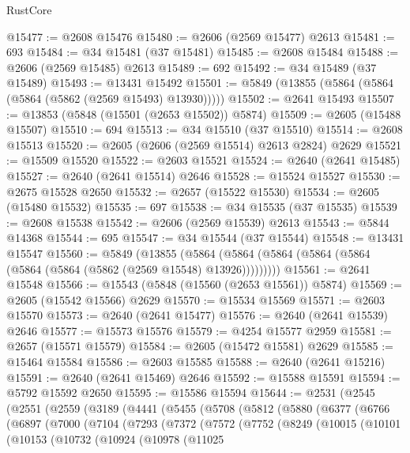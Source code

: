 \begin{lexlean}{RustCore}
\begin{coremodule}
@15477 := @2608 @15476
@15480 := @2606 (@2569 @15477) @2613
@15481 := 693
@15484 := @34 @15481 (@37 @15481)
@15485 := @2608 @15484
@15488 := @2606 (@2569 @15485) @2613
@15489 := 692
@15492 := @34 @15489 (@37 @15489)
@15493 := @13431 @15492
@15501 := @5849 (@13855 (@5864 (@5864 (@5864 (@5862 (@2569 @15493) @13930)))))
@15502 := @2641 @15493
@15507 := @13853 (@5848 (@15501 (@2653 @15502)) @5874)
@15509 := @2605 (@15488 @15507)
@15510 := 694
@15513 := @34 @15510 (@37 @15510)
@15514 := @2608 @15513
@15520 := @2605 (@2606 (@2569 @15514) @2613 @2824) @2629
@15521 := @15509 @15520
@15522 := @2603 @15521
@15524 := @2640 (@2641 @15485)
@15527 := @2640 (@2641 @15514) @2646
@15528 := @15524 @15527
@15530 := @2675 @15528 @2650
@15532 := @2657 (@15522 @15530)
@15534 := @2605 (@15480 @15532)
@15535 := 697
@15538 := @34 @15535 (@37 @15535)
@15539 := @2608 @15538
@15542 := @2606 (@2569 @15539) @2613
@15543 := @5844 @14368
@15544 := 695
@15547 := @34 @15544 (@37 @15544)
@15548 := @13431 @15547
@15560 := @5849
    (@13855 (@5864 (@5864 (@5864 (@5864 (@5864 (@5864 (@5864 (@5862 (@2569 @15548) @13926)))))))))
@15561 := @2641 @15548
@15566 := @15543 (@5848 (@15560 (@2653 @15561)) @5874)
@15569 := @2605 (@15542 @15566) @2629
@15570 := @15534 @15569
@15571 := @2603 @15570
@15573 := @2640 (@2641 @15477)
@15576 := @2640 (@2641 @15539) @2646
@15577 := @15573 @15576
@15579 := @4254 @15577 @2959
@15581 := @2657 (@15571 @15579)
@15584 := @2605 (@15472 @15581) @2629
@15585 := @15464 @15584
@15586 := @2603 @15585
@15588 := @2640 (@2641 @15216)
@15591 := @2640 (@2641 @15469) @2646
@15592 := @15588 @15591
@15594 := @5792 @15592 @2650
@15595 := @15586 @15594
@15644 := @2531
    (@2545
      (@2551
        (@2559
          (@3189
            (@4441
              (@5455
                (@5708
                  (@5812
                    (@5880
                      (@6377
                        (@6766
                          (@6897
                            (@7000
                              (@7104
                                (@7293
                                  (@7372
                                    (@7572
                                      (@7752
                                        (@8249
                                          (@10015
                                            (@10101
                                              (@10153
                                                (@10732
                                                  (@10924
                                                    (@10978
                                                      (@11025

\end{coremodule}
\end{lexlean}

